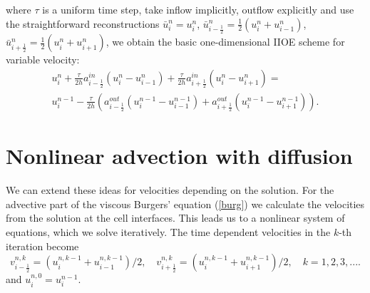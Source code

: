 \documentclass[../include.tex]{subfiles}
\begin{document}
where $ \tau $ is a uniform time step, take inflow implicitly, outflow explicitly and use the straightforward reconstructions $ \bar u_i^n = u^n_i $, $ \bar u_{i - \frac{1}{2}}^n = \frac{1}{2} (u_i^n + u_{i-1}^n) $, $ \bar u_{i + \frac{1}{2}}^n = \frac{1}{2} (u_i^n + u_{i+1}^n) $, we obtain the basic one-dimensional IIOE scheme for variable velocity:
\begin{eqnarray}
	\label{iioe0}
	u^n_i + \frac{\tau}{2h} a^{in}_{i-\frac{1}{2}}  \left(u^n_i - u^n_{i-1}\right) + 
	\frac{\tau}{2h} a^{in}_{i+\frac{1}{2}} \left(u^n_i - u^n_{i+1}\right) = \\
	u^{n-1}_i - \frac{\tau}{2h} \left(a^{out}_{i-\frac{1}{2}} \left(u^{n-1}_i - u^{n-1}_{i-1}\right) + 
	a^{out}_{i+\frac{1}{2}} \left(u^{n-1}_i - u^{n-1}_{i+1}\right)\right).\nonumber
\end{eqnarray}
\section{Nonlinear advection with diffusion}

We can extend these ideas for velocities depending on the solution. For the advective part of the viscous Burgers' equation (\ref{burg}) we calculate the velocities from the solution at the cell interfaces. This leads us to a nonlinear system of equations, which we solve iteratively. The time dependent velocities in the $ k $-th iteration become
\[ v^{n,k}_{i-\frac{1}{2}} = (u^{n,k-1}_i + u^{n,k-1}_{i-1})\slash 2,\quad
v^{n,k}_{i+\frac{1}{2}} = (u^{n,k-1}_i + u^{n,k-1}_{i+1})\slash 2,\quad k=1,2,3,.... \]
and $ u^{n,0}_i = u^{n-1}_i $.
\end{document}
